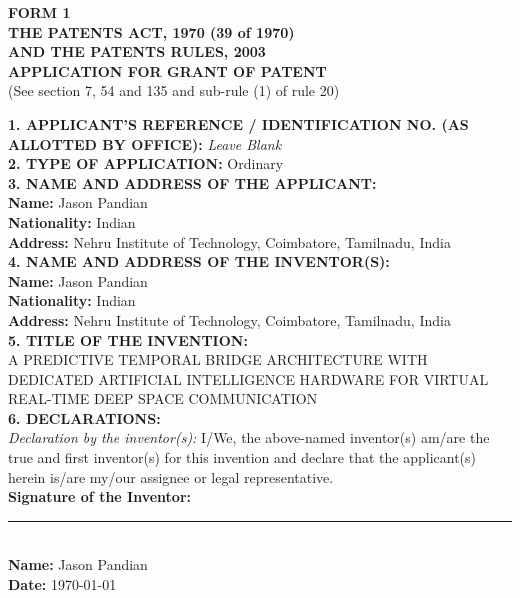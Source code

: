 \documentclass[12pt,a4paper]{article}
\begin{document}
\begin{center}
    \textbf{\large FORM 1} \\
    \vspace{0.3cm}
    \textbf{THE PATENTS ACT, 1970 (39 of 1970)} \\
    \textbf{AND THE PATENTS RULES, 2003} \\
    \vspace{0.5cm}
    \textbf{\large APPLICATION FOR GRANT OF PATENT} \\
    (See section 7, 54 and 135 and sub-rule (1) of rule 20)
\end{center}
\vspace{1cm}

\noindent \textbf{1. APPLICANT'S REFERENCE / IDENTIFICATION NO. (AS ALLOTTED BY OFFICE):} \textit{Leave Blank} \\

\noindent \textbf{2. TYPE OF APPLICATION:} Ordinary \\

\noindent \textbf{3. NAME AND ADDRESS OF THE APPLICANT:} \\
\textbf{Name:} Jason Pandian \\
\textbf{Nationality:} Indian \\
\textbf{Address:} Nehru Institute of Technology, Coimbatore, Tamilnadu, India \\

\noindent \textbf{4. NAME AND ADDRESS OF THE INVENTOR(S):} \\
\textbf{Name:} Jason Pandian \\
\textbf{Nationality:} Indian \\
\textbf{Address:} Nehru Institute of Technology, Coimbatore, Tamilnadu, India \\

\noindent \textbf{5. TITLE OF THE INVENTION:} \\
A PREDICTIVE TEMPORAL BRIDGE ARCHITECTURE WITH DEDICATED ARTIFICIAL INTELLIGENCE HARDWARE FOR VIRTUAL REAL-TIME DEEP SPACE COMMUNICATION \\

\noindent \textbf{6. DECLARATIONS:} \\
\textit{Declaration by the inventor(s):} I/We, the above-named inventor(s) am/are the true and first inventor(s) for this invention and declare that the applicant(s) herein is/are my/our assignee or legal representative. \\

\vspace{2cm}
\noindent \textbf{Signature of the Inventor:} \rule{4cm}{0.4pt} \\
\textbf{Name:} Jason Pandian \\
\textbf{Date:} \today \\
\end{document}
